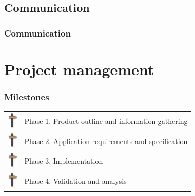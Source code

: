 \documentclass{beamer}
\theoremstyle{definition} \newtheorem{mdefinition}{Definition}
\theoremstyle{plain} \newtheorem{mtheorem}{Theorem}
\theoremstyle{plain} \newtheorem{mcorollary}{Corollary}
\theoremstyle{plain} \newtheorem{mfact}{Fact}
\begin{document}
\subsection{Communication}
\begin{frame}
	\frametitle{Communication}

\end{frame}

\section{Project management}
\begin{frame}
	\frametitle{Milestones}

\begin{tabular}{ll}

\includegraphics[height=0.3in]{img/milestone_03} & Phase 1. Product outline and information gathering\\
\includegraphics[height=0.3in]{img/milestone_03} & Phase 2. Application requirements and specification\\
\includegraphics[height=0.3in]{img/milestone_03} & Phase 3. Implementation\\
\includegraphics[height=0.3in]{img/milestone_03} & Phase 4. Validation and analysis\\
\end{tabular}


\end{frame}
\end{document}
